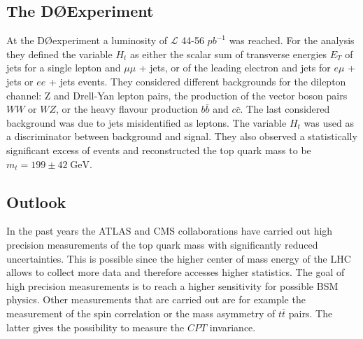 \subsection{The D\O Experiment}
At the D\O \;experiment a luminosity of $\mathcal{L}$ 44-56 $pb^{-1}$ was reached. For the analysis they defined the variable $H_t$ as either the scalar sum of transverse energies $E_T$ of jets for a single lepton and $\mu\mu$ + jets, or of the leading electron and jets for $e\mu$ + jets or $ee$ + jets events.
They considered different backgrounds for the dilepton channel: Z and Drell-Yan lepton pairs, the production of the vector boson pairs $WW$ or $WZ$, or the heavy flavour production $b\bar{b}$ and $c\bar{c}$. The last considered background was due to jets misidentified as leptons. The variable $H_t$ was used as a discriminator between background and signal.
They also observed a statistically significant excess of events and reconstructed the top quark mass to be $m_{t} = 199 \pm 42 \;\si{\GeV} $.

\subsection*{Outlook}
In the past years the ATLAS and CMS collaborations have carried out high precision measurements of the top quark mass with significantly reduced uncertainties. This is possible since the higher center of mass energy of the LHC allows to collect more data and therefore accesses higher statistics. The goal of high precision measurements is to reach a higher sensitivity for possible BSM physics. Other measurements that are carried out are for example the measurement of the spin correlation or the mass asymmetry of $t\bar{t}$ pairs. The latter gives the possibility to measure the $CPT$ invariance.
